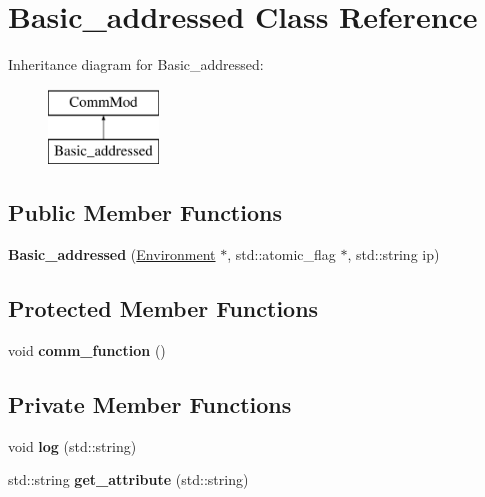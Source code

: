 \hypertarget{class_basic__addressed}{}\section{Basic\+\_\+addressed Class Reference}
\label{class_basic__addressed}
Inheritance diagram for Basic\+\_\+addressed\+:\begin{figure}[H]
\begin{center}
\leavevmode
\includegraphics[height=2.000000cm]{class_basic__addressed}
\end{center}
\end{figure}
\subsection*{Public Member Functions}
\begin{DoxyCompactItemize}
\item 
{\bfseries Basic\+\_\+addressed} (\hyperlink{class_environment}{Environment} $\ast$, std\+::atomic\+\_\+flag $\ast$, std\+::string ip)\hypertarget{class_basic__addressed_a9a202e4eab46bb38b02ca1e0699d3084}{}\label{class_basic__addressed_a9a202e4eab46bb38b02ca1e0699d3084}

\end{DoxyCompactItemize}
\subsection*{Protected Member Functions}
\begin{DoxyCompactItemize}
\item 
void {\bfseries comm\+\_\+function} ()\hypertarget{class_basic__addressed_ac884eb8fca81e164c0f6c073b2d4df80}{}\label{class_basic__addressed_ac884eb8fca81e164c0f6c073b2d4df80}

\end{DoxyCompactItemize}
\subsection*{Private Member Functions}
\begin{DoxyCompactItemize}
\item 
void {\bfseries log} (std\+::string)\hypertarget{class_basic__addressed_a5670a1cc648618caddc345935856e5c0}{}\label{class_basic__addressed_a5670a1cc648618caddc345935856e5c0}

\item 
std\+::string {\bfseries get\+\_\+attribute} (std\+::string)\hypertarget{class_basic__addressed_aa75d84e2076b7ae4de8ddde1074da8ed}{}\label{class_basic__addressed_aa75d84e2076b7ae4de8ddde1074da8ed}

\end{DoxyCompactItemize}
